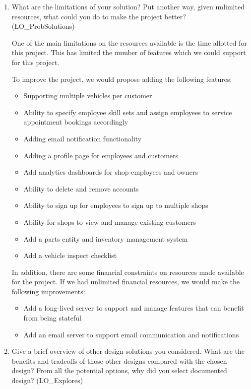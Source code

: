 \documentclass[12pt, titlepage]{article}
\begin{document}
\begin{enumerate}
	\item What are the limitations of your solution? Put another way, given unlimited resources, what could
	      you do to make the project better? (LO\_ProbSolutions)

	      One of the main limitations on the resources available is the time allotted for this project. This
	      has limited the number of features which we could support for this project.

	      To improve the project, we would propose adding the following features:
	      \begin{itemize}
		      \item Supporting multiple vehicles per customer
		      \item Ability to specify employee skill sets and assign employees to service appointment bookings
		            accordingly
		      \item Adding email notification functionality
		      \item Adding a profile page for employees and customers
		      \item Add analytics dashboards for shop employees and owners
		      \item Ability to delete and remove accounts
		      \item Ability to sign up for employees to sign up to multiple shops
		      \item Ability for shops to view and manage existing customers
		      \item Add a parts entity and inventory management system
		      \item Add a vehicle inspect checklist
	      \end{itemize}

	      In addition, there are some financial constraints on resources made available for the project. If
	      we had unlimited financial resources, we would make the following improvements:
	      \begin{itemize}
		      \item Add a long-lived server to support and manage features that can benefit from being stateful
		      \item Add an email server to support email communication and notifications
	      \end{itemize}

	\item Give a brief overview of other design solutions you considered. What are the benefits and tradeoffs
	      of those other designs compared with the chosen design? From all the potential options, why did you
	      select documented design? (LO\_Explores)


\end{enumerate}
\end{document}
